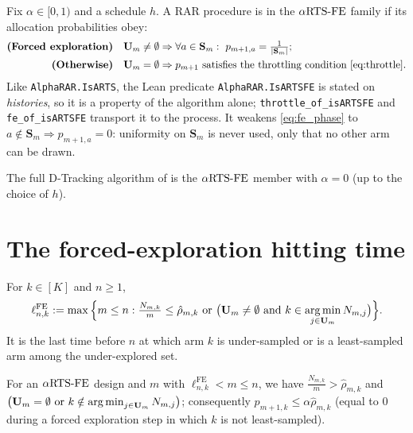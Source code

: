 \begin{definition}\label{def:aRTSFE}
\leanok
{}
Fix $\alpha\in[0,1)$ and a schedule $h$. A RAR procedure is in the $\alpha\text{RTS-FE}$
family if its allocation probabilities obey:
\begin{align}
  \textbf{(Forced exploration)}\quad
    &\mathbf{U}_m\ne\emptyset \Rightarrow \forall a\in\mathbf{S}_m:\ p_{m+1,a}=\tfrac{1}{|\mathbf{S}_m|};
    \label{eq:fe_phase}\\
  \textbf{(Otherwise)}\quad
    &\mathbf{U}_m=\emptyset \Rightarrow p_{m+1}\ \text{satisfies the throttling condition \eqref{eq:throttle}.}
    \label{eq:fe_otherwise}
\end{align}
Like \texttt{AlphaRAR.IsARTS}, the Lean predicate \texttt{AlphaRAR.IsARTSFE} is stated on
\emph{histories}, so it is a property of the algorithm alone; \texttt{throttle\_of\_isARTSFE} and
\texttt{fe\_of\_isARTSFE} transport it to the process. It weakens \eqref{eq:fe_phase} to
$a\notin\mathbf{S}_m\Rightarrow p_{m+1,a}=0$: uniformity on $\mathbf{S}_m$ is never used, only that
no other arm can be drawn.
\end{definition}

\begin{remark}\label{rem:d_tracking_fe}
The full D-Tracking algorithm of \cite{garivier2016optimal} is the $\alpha\text{RTS-FE}$
member with $\alpha=0$ (up to the choice of $h$).
\end{remark}

\section{The forced-exploration hitting time}
\label{sec:forced_hitting}

\begin{definition}\label{def:hitting_fe}
\leanok
{}
For $k\in[K]$ and $n\ge1$,
\[
  \ell_{n,k}^{\mathrm{FE}} := \max\Big\{ m\le n :
    \tfrac{N_{m,k}}{m}\le\hat{\rho}_{m,k}
    \ \text{or}\ \big(\mathbf{U}_m\ne\emptyset\ \text{and}\ k\in\argmin_{j\in\mathbf{U}_m}N_{m,j}\big)\Big\}.
\]
It is the last time before $n$ at which arm $k$ is under-sampled or is a
least-sampled arm among the under-explored set.
\end{definition}

\begin{lemma}\label{lem:hitting_fe_sign}
\leanok
{}
For an $\alpha\text{RTS-FE}$ design and $m$ with $\ell_{n,k}^{\mathrm{FE}} < m \le n$,
we have $\frac{N_{m,k}}{m} > \hat{\rho}_{m,k}$ and
$\big(\mathbf{U}_m=\emptyset\ \text{or}\ k\notin\argmin_{j\in\mathbf{U}_m}N_{m,j}\big)$;
consequently $p_{m+1,k}\le\alpha\hat{\rho}_{m,k}$ (equal to $0$ during a forced
exploration step in which $k$ is not least-sampled).
\end{lemma}

